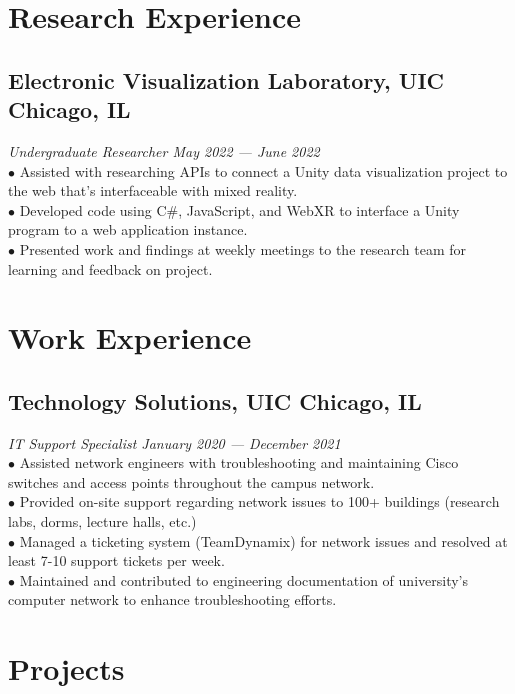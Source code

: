 \documentclass{article}
\begin{document}
\section{Research Experience}
\subsection{Electronic Visualization Laboratory, UIC \hfill \textnormal{Chicago, IL}}
\vspace{-0.5em}
\textit{Undergraduate Researcher \hfill May 2022 --- June 2022}
\\
$\bullet$ Assisted with researching APIs to connect a Unity data visualization project to the web that's interfaceable with mixed reality.
\\
$\bullet$ Developed code using C\#, JavaScript, and WebXR to interface a Unity program to a web application instance.
\\
$\bullet$ Presented work and findings at weekly meetings to the research team for learning and feedback on project.


\section{Work Experience}
\subsection{Technology Solutions, UIC \hfill \textnormal{Chicago, IL}}
\vspace{-0.5em}
\textit{IT Support Specialist \hfill January 2020 --- December 2021}
\\
$\bullet$ Assisted network engineers with troubleshooting and maintaining Cisco switches and access points throughout the campus network.
\\
$\bullet$ Provided on-site support regarding network issues to 100+ buildings (research labs, dorms, lecture halls, etc.)
\\
$\bullet$ Managed a ticketing system (TeamDynamix) for network issues and resolved at least 7-10 support tickets per week.
\\
$\bullet$ Maintained and contributed to engineering documentation of university's computer network to enhance troubleshooting efforts.


\section{Projects}
\end{document}

